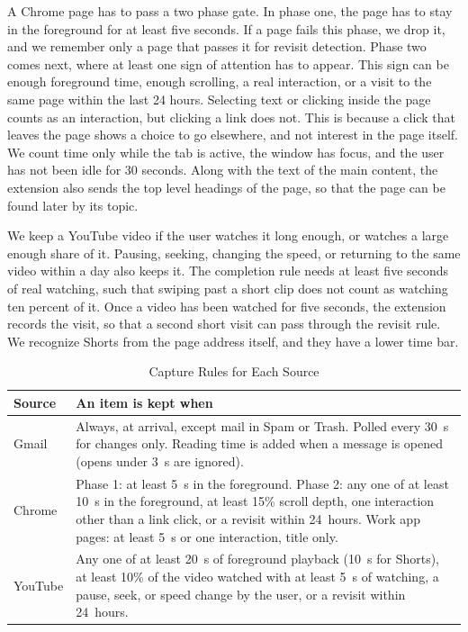 \documentclass[conference]{IEEEtran}
\begin{document}
A Chrome page has to pass a two phase gate. In phase one, the page has to stay in the foreground for at least five seconds. If a page fails this phase, we drop it, and we remember only a page that passes it for revisit detection. Phase two comes next, where at least one sign of attention has to appear. This sign can be enough foreground time, enough scrolling, a real interaction, or a visit to the same page within the last 24 hours. Selecting text or clicking inside the page counts as an interaction, but clicking a link does not. This is because a click that leaves the page shows a choice to go elsewhere, and not interest in the page itself. We count time only while the tab is active, the window has focus, and the user has not been idle for 30 seconds. Along with the text of the main content, the extension also sends the top level headings of the page, so that the page can be found later by its topic.

We keep a YouTube video if the user watches it long enough, or watches a large enough share of it. Pausing, seeking, changing the speed, or returning to the same video within a day also keeps it. The completion rule needs at least five seconds of real watching, such that swiping past a short clip does not count as watching ten percent of it. Once a video has been watched for five seconds, the extension records the visit, so that a second short visit can pass through the revisit rule. We recognize Shorts from the page address itself, and they have a lower time bar.

\begin{table}[t]
\caption{Capture Rules for Each Source}
\label{tab:gates}
\centering
\renewcommand{\arraystretch}{1.15}
\begin{tabular}{|>{\raggedright\arraybackslash}p{1.35cm}|>{\raggedright\arraybackslash}p{6.2cm}|}
\hline
\textbf{Source} & \textbf{An item is kept when} \\
\hline
Gmail & Always, at arrival, except mail in Spam or Trash. Polled every 30~s for changes only. Reading time is added when a message is opened (opens under 3~s are ignored). \\
\hline
Chrome & Phase 1: at least 5~s in the foreground. Phase 2: any one of at least 10~s in the foreground, at least 15\% scroll depth, one interaction other than a link click, or a revisit within 24~hours. Work app pages: at least 5~s or one interaction, title only. \\
\hline
YouTube & Any one of at least 20~s of foreground playback (10~s for Shorts), at least 10\% of the video watched with at least 5~s of watching, a pause, seek, or speed change by the user, or a revisit within 24~hours. \\
\hline
\end{tabular}
\end{table}
\end{document}
